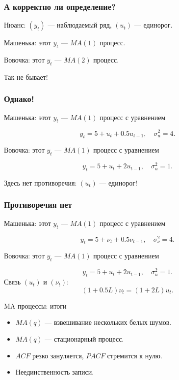 \begin{frame}
  \frametitle{А корректно ли определение?}
  
  Нюанс: $(y_t)$ — наблюдаемый ряд, $(u_t)$ — \alert{единорог}.

  \pause

  Машенька: этот $y_t$ — $MA(1)$ процесс.

  Вовочка: этот $y_t$ — $MA(2)$ процесс. 

  \pause 

  Так \alert{не бывает!}

\end{frame}



\begin{frame}
  \frametitle{Однако!}

  Машенька: этот $y_t$ — $MA(1)$ процесс с уравнением

  \[
    y_t = 5 + u_t + 0.5 u_{t-1}, \quad \sigma^2_u = 4.
  \]

  Вовочка: этот $y_t$ — $MA(1)$ процесс с уравнением

  \[
    y_t = 5 + u_t + 2 u_{t-1}, \quad \sigma^2_u = 1.
  \]

  \pause
  Здесь \alert{нет противоречия}: $(u_t)$ — единорог!
\end{frame}

\begin{frame}
  \frametitle{Противоречия нет}

  Машенька: этот $y_t$ — $MA(1)$ процесс с уравнением

  \[
    y_t = 5 + \nu_t + 0.5 \nu_{t-1}, \quad \sigma^2_{\nu} = 4.
  \]

  Вовочка: этот $y_t$ — $MA(1)$ процесс с уравнением

  \[
    y_t = 5 + u_t + 2 u_{t-1}, \quad \sigma^2_u = 1.
  \]
  \pause
  Связь $(u_t)$ и $(\nu_t)$:
  \[
  (1+0.5L)\nu_t = (1+2L)u_t.  
  \]
\end{frame}



\begin{frame}{MA процессы: итоги}

  \begin{itemize}[<+->]
    \item $MA(q)$ — взвешивание нескольких белых шумов. 
    \item $MA(q)$ — стационарный процесс. 
    \item $ACF$ резко зануляется, $PACF$ стремится к нулю.
    \item Неединственность записи. 
  \end{itemize}
\end{frame}



